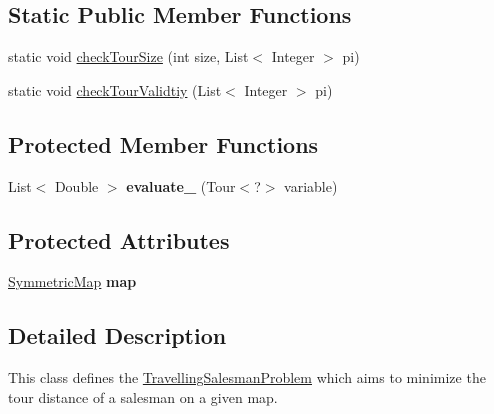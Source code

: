 \subsection*{Static Public Member Functions}
\begin{DoxyCompactItemize}
\item 
static void \hyperlink{classcom_1_1msu_1_1tsp_1_1TravellingSalesmanProblem_ad95a98935d07fa7acd8cb505d00c7d2f}{check\-Tour\-Size} (int size, List$<$ Integer $>$ pi)
\item 
static void \hyperlink{classcom_1_1msu_1_1tsp_1_1TravellingSalesmanProblem_ab1efe77a150e9413156162105ae954bf}{check\-Tour\-Validtiy} (List$<$ Integer $>$ pi)
\end{DoxyCompactItemize}
\subsection*{Protected Member Functions}
\begin{DoxyCompactItemize}
\item 
\hypertarget{classcom_1_1msu_1_1tsp_1_1TravellingSalesmanProblem_ac9587ac7ae89eaf8ff668a1b5ffa0ee6}{List$<$ Double $>$ {\bfseries evaluate\-\_\-} (Tour$<$?$>$ variable)}\label{classcom_1_1msu_1_1tsp_1_1TravellingSalesmanProblem_ac9587ac7ae89eaf8ff668a1b5ffa0ee6}

\end{DoxyCompactItemize}
\subsection*{Protected Attributes}
\begin{DoxyCompactItemize}
\item 
\hypertarget{classcom_1_1msu_1_1tsp_1_1TravellingSalesmanProblem_adf1dcf831a6523d1eb26ef2cdcb759e4}{\hyperlink{classcom_1_1msu_1_1thief_1_1model_1_1SymmetricMap}{Symmetric\-Map} {\bfseries map}}\label{classcom_1_1msu_1_1tsp_1_1TravellingSalesmanProblem_adf1dcf831a6523d1eb26ef2cdcb759e4}

\end{DoxyCompactItemize}


\subsection{Detailed Description}
This class defines the \hyperlink{classcom_1_1msu_1_1tsp_1_1TravellingSalesmanProblem}{Travelling\-Salesman\-Problem} which aims to minimize the tour distance of a salesman on a given map. 

